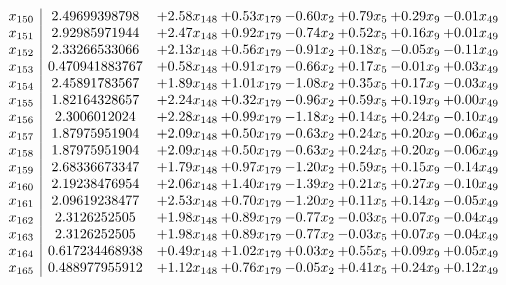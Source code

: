 \documentclass[8pt]{article}
\begin{document}
\[\begin{array}{c| c c@{\hskip 2pt} c@{\hskip 2pt} c@{\hskip 2pt} c@{\hskip 2pt} c@{\hskip 2pt} c@{\hskip 2pt} }
 x_{150}   &  2.49699398798 & +  2.58 x_{148} & +  0.53 x_{179} & -0.60 x_{2} & +  0.79 x_{5} & +  0.29 x_{9} & -0.01 x_{49}\\
 x_{151}   &  2.92985971944 & +  2.47 x_{148} & +  0.92 x_{179} & -0.74 x_{2} & +  0.52 x_{5} & +  0.16 x_{9} & +  0.01 x_{49}\\
 x_{152}   &  2.33266533066 & +  2.13 x_{148} & +  0.56 x_{179} & -0.91 x_{2} & +  0.18 x_{5} & -0.05 x_{9} & -0.11 x_{49}\\
 x_{153}   &  0.470941883767 & +  0.58 x_{148} & +  0.91 x_{179} & -0.66 x_{2} & +  0.17 x_{5} & -0.01 x_{9} & +  0.03 x_{49}\\
 x_{154}   &  2.45891783567 & +  1.89 x_{148} & +  1.01 x_{179} & -1.08 x_{2} & +  0.35 x_{5} & +  0.17 x_{9} & -0.03 x_{49}\\
 x_{155}   &  1.82164328657 & +  2.24 x_{148} & +  0.32 x_{179} & -0.96 x_{2} & +  0.59 x_{5} & +  0.19 x_{9} & +  0.00 x_{49}\\
 x_{156}   &  2.3006012024 & +  2.28 x_{148} & +  0.99 x_{179} & -1.18 x_{2} & +  0.14 x_{5} & +  0.24 x_{9} & -0.10 x_{49}\\
 x_{157}   &  1.87975951904 & +  2.09 x_{148} & +  0.50 x_{179} & -0.63 x_{2} & +  0.24 x_{5} & +  0.20 x_{9} & -0.06 x_{49}\\
 x_{158}   &  1.87975951904 & +  2.09 x_{148} & +  0.50 x_{179} & -0.63 x_{2} & +  0.24 x_{5} & +  0.20 x_{9} & -0.06 x_{49}\\
 x_{159}   &  2.68336673347 & +  1.79 x_{148} & +  0.97 x_{179} & -1.20 x_{2} & +  0.59 x_{5} & +  0.15 x_{9} & -0.14 x_{49}\\
 x_{160}   &  2.19238476954 & +  2.06 x_{148} & +  1.40 x_{179} & -1.39 x_{2} & +  0.21 x_{5} & +  0.27 x_{9} & -0.10 x_{49}\\
 x_{161}   &  2.09619238477 & +  2.53 x_{148} & +  0.70 x_{179} & -1.20 x_{2} & +  0.11 x_{5} & +  0.14 x_{9} & -0.05 x_{49}\\
 x_{162}   &  2.3126252505 & +  1.98 x_{148} & +  0.89 x_{179} & -0.77 x_{2} & -0.03 x_{5} & +  0.07 x_{9} & -0.04 x_{49}\\
 x_{163}   &  2.3126252505 & +  1.98 x_{148} & +  0.89 x_{179} & -0.77 x_{2} & -0.03 x_{5} & +  0.07 x_{9} & -0.04 x_{49}\\
 x_{164}   &  0.617234468938 & +  0.49 x_{148} & +  1.02 x_{179} & +  0.03 x_{2} & +  0.55 x_{5} & +  0.09 x_{9} & +  0.05 x_{49}\\
 x_{165}   &  0.488977955912 & +  1.12 x_{148} & +  0.76 x_{179} & -0.05 x_{2} & +  0.41 x_{5} & +  0.24 x_{9} & +  0.12 x_{49}\\

\end{array}\]
\end{document}
